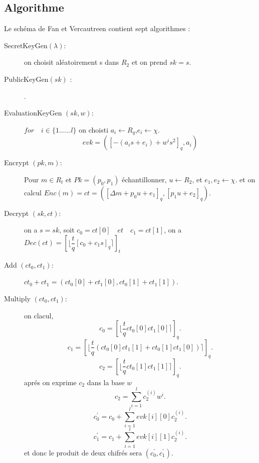 \documentclass[a4paper,11pt]{report}
\begin{document}
\subsection*{Algorithme}
Le schéma de Fan et Vercautreen contient sept algorithmes : \newline
 \begin{description}
 \item[SecretKeyGen$(\lambda)$:]  on choisit aléatoirement s dans $R_2$ et on prend $sk=s$.
 \item[PublicKeyGen$(sk)$ :] .
 \item[EvaluationKeyGen $(sk, w)$:] $for\quad i\in \{1......l\}$ on choisti $a_i\xleftarrow{}{}R_q$,$e_i\xleftarrow{}{}\chi.$\newline
 $$evk = ([-(a_is+e_i)+w^is^2]_q, a_i)$$
 \item[Encrypt $(pk, m)$:] Pour $m \in R_t$ et $Pk = (p_0, p_1)$ échantillonner, $u\xleftarrow{}{} {R_2}$, et $e_1,e_2 \xleftarrow{}{} \chi$.
 \newline et on calcul $Enc(m) = ct = ([\Delta m + p_0 u + e_1]_q, [p_1 u + e_2]_q).$
 \item[Decrypt $(sk, ct)$:] on a $s = sk $, soit $c_0 = ct[0]\quad et\quad c_1 = ct[1]$, on a $Dec(ct) = [\lfloor\dfrac{t}{q}[c_0 + c_1 s]_q\rceil]_t$
 \item[Add  $(ct_0, ct_1)$:]  $ct_0 + ct_1 = (ct_0[0] + ct_1[0], ct_0[1] + ct_1[1])$.
 \item[Multiply $(ct_0, ct_1)$:] on clacul, \newline
 $$c_0 = [\lfloor\dfrac{t}{q}ct_0[0]ct_1[0]\rceil]_q.$$
 $$c_1 = [\lfloor\dfrac{t}{q}(ct_0[0]ct_1[1] + ct_0[1]ct_1[0])\rceil]_q.$$
 $$c_2 = [\lfloor\dfrac{t}{q}ct_0[1]ct_1[1]\rceil]_q .$$ 
 aprés on exprime $c_2 $ dans la base $w$ $$c_2 = \sum_{i=1}^{l}c_2^{(i)}w^i.$$
 $$c_0^{'} = c_0 + \sum_{i=1}^{l}evk[i][0]c_2^{(i)} .$$
 $$c_1^{'} = c_1 + \sum_{i=1}^{l}evk[i][1]c_2^{(i)} .$$
 et donc le produit de deux chifrés sera $(c_0^{'}, c_1^{'}).$
  \end{description}
\end{document}
